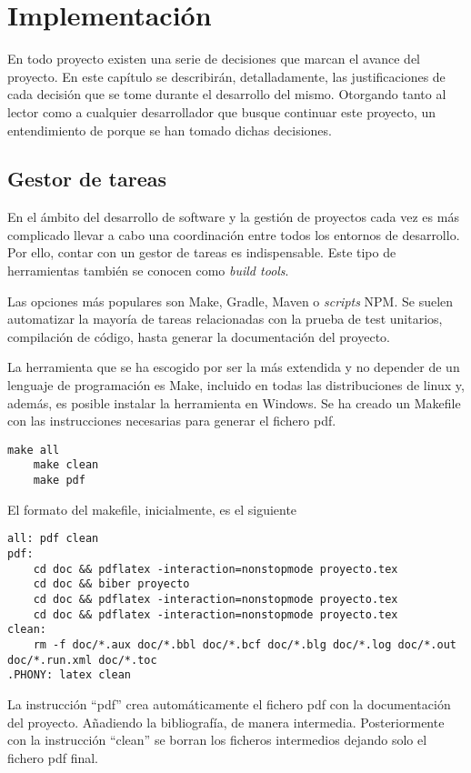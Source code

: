 \chapter{Implementación}
En todo proyecto existen una serie de decisiones que marcan el avance del proyecto. En este capítulo se describirán, detalladamente, las justificaciones de cada decisión que se tome durante el desarrollo del mismo. Otorgando tanto al lector como a cualquier desarrollador que busque continuar este proyecto, un entendimiento de porque se han tomado dichas decisiones.

\section{Gestor de tareas}
En el ámbito del desarrollo de software y la gestión de proyectos cada vez es más complicado llevar a cabo una coordinación entre todos los entornos de desarrollo. Por ello, contar con un gestor de tareas es indispensable. Este tipo de herramientas también se conocen como \textit{build tools}. 

Las opciones más populares son Make, Gradle, Maven o \textit{scripts} NPM. Se suelen automatizar la mayoría de tareas relacionadas con la prueba de test unitarios, compilación de código, hasta generar la documentación del proyecto. 

La herramienta que se ha escogido por ser la más extendida y no depender de un lenguaje de programación es Make, incluido en todas las distribuciones de linux y, además, es posible instalar la herramienta en Windows. Se ha creado un Makefile con las instrucciones necesarias para generar el fichero pdf.

\begin{lstlisting}[style=consola]
    make all
    make clean
    make pdf
\end{lstlisting}
\newpage
El formato del makefile, inicialmente, es el siguiente
\begin{lstlisting}[style=consola]
all: pdf clean
pdf:
	cd doc && pdflatex -interaction=nonstopmode proyecto.tex
	cd doc && biber proyecto
	cd doc && pdflatex -interaction=nonstopmode proyecto.tex
	cd doc && pdflatex -interaction=nonstopmode proyecto.tex
clean:
	rm -f doc/*.aux doc/*.bbl doc/*.bcf doc/*.blg doc/*.log doc/*.out doc/*.run.xml doc/*.toc
.PHONY: latex clean
\end{lstlisting}

La instrucción ``pdf'' crea automáticamente el fichero pdf con la documentación del proyecto. Añadiendo la bibliografía, de manera intermedia. Posteriormente con la instrucción ``clean'' se borran los ficheros intermedios dejando solo el fichero pdf final. 